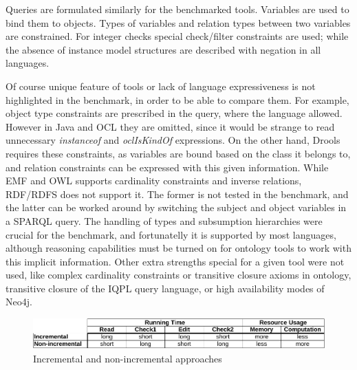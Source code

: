 Queries are formulated similarly for the benchmarked tools. Variables are used
to bind them to objects. Types of variables and relation types between two
variables are constrained. For integer checks special check/filter constraints
are used; while the absence of instance model structures are described with
negation in all languages.


Of course unique feature of tools or lack of language expressiveness is not
highlighted in the benchmark, in order to be able to compare them. For example,
object type constraints are prescribed in the query, where the language allowed.
However in Java and OCL they are omitted, since it would be strange to read
unnecessary \emph{instanceof} and \emph{oclIsKindOf} expressions. On the other
hand, Drools requires these constraints, as variables are bound based on the
class it belongs to, and relation constraints can be expressed with this given
information. While EMF and OWL supports cardinality constraints and inverse
relations, RDF/RDFS does not support it. The former is not tested in the
benchmark, and the latter can be worked around by switching the subject and
object variables in a SPARQL query.
The handling of types and subsumption hierarchies were crucial for the
benchmark, and fortunatelly it is supported by most languages, although
reasoning capabilities must be turned on for ontology tools to work with this
implicit information. Other extra strengths special for a given tool were not
used, like complex cardinality constraints or transitive closure axioms in
ontology, transitive closure of the IQPL query language, or high availability
modes of Neo4j.



\begin{figure}[Hht]
\includegraphics[width=\textwidth]{figures/incNonInc.pdf}
\caption{Incremental and non-incremental approaches}
\label{tbl:incNonInc}
\end{figure}

